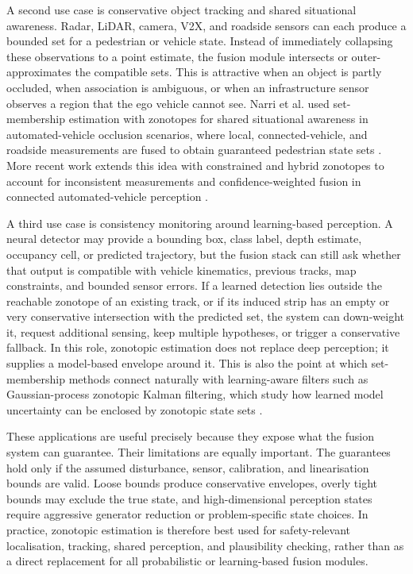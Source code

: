 \documentclass{ieeeaccess}
\begin{document}
A second use case is conservative object tracking and shared situational awareness. Radar, LiDAR, camera, V2X, and roadside sensors can each produce a bounded set for a pedestrian or vehicle state. Instead of immediately collapsing these observations to a point estimate, the fusion module intersects or outer-approximates the compatible sets. This is attractive when an object is partly occluded, when association is ambiguous, or when an infrastructure sensor observes a region that the ego vehicle cannot see. Narri et al. used set-membership estimation with zonotopes for shared situational awareness in automated-vehicle occlusion scenarios, where local, connected-vehicle, and roadside measurements are fused to obtain guaranteed pedestrian state sets \cite{narri2021_set_membership_shared_awareness,narri2025_set_based_awareness}. More recent work extends this idea with constrained and hybrid zonotopes to account for inconsistent measurements and confidence-weighted fusion in connected automated-vehicle perception \cite{narri2026_hybrid_zonotope_awareness}.

A third use case is consistency monitoring around learning-based perception. A neural detector may provide a bounding box, class label, depth estimate, occupancy cell, or predicted trajectory, but the fusion stack can still ask whether that output is compatible with vehicle kinematics, previous tracks, map constraints, and bounded sensor errors. If a learned detection lies outside the reachable zonotope of an existing track, or if its induced strip has an empty or very conservative intersection with the predicted set, the system can down-weight it, request additional sensing, keep multiple hypotheses, or trigger a conservative fallback. In this role, zonotopic estimation does not replace deep perception; it supplies a model-based envelope around it. This is also the point at which set-membership methods connect naturally with learning-aware filters such as Gaussian-process zonotopic Kalman filtering, which study how learned model uncertainty can be enclosed by zonotopic state sets \cite{li2022_gp_zkf}.

These applications are useful precisely because they expose what the fusion system can guarantee. Their limitations are equally important. The guarantees hold only if the assumed disturbance, sensor, calibration, and linearisation bounds are valid. Loose bounds produce conservative envelopes, overly tight bounds may exclude the true state, and high-dimensional perception states require aggressive generator reduction or problem-specific state choices. In practice, zonotopic estimation is therefore best used for safety-relevant localisation, tracking, shared perception, and plausibility checking, rather than as a direct replacement for all probabilistic or learning-based fusion modules.
\end{document}

